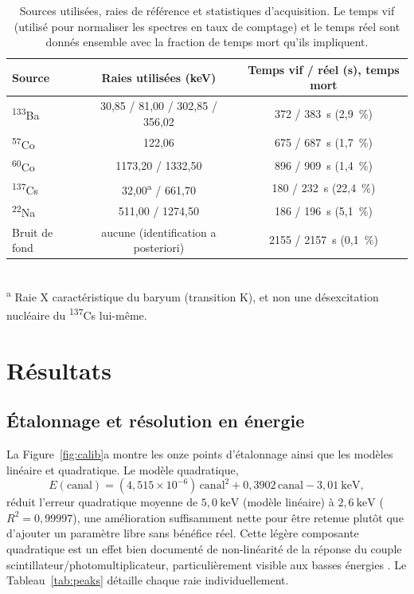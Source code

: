 \documentclass[11pt,letterpaper]{article}
\newcommand{\beq}[1]{\begin{equation} \label{#1}}
\def\enq{\end{equation}}
\begin{document}
\begin{table}[htbp]
\centering
\caption{Sources utilisées, raies de référence et statistiques d'acquisition. Le temps vif (utilisé pour normaliser les spectres en taux de comptage) et le temps réel sont donnés ensemble avec la fraction de temps mort qu'ils impliquent.}
\label{tab:acquisitions}
\small
\begin{tabular}{lcc}
\hline
Source & Raies utilisées (keV) & Temps vif / réel (s), temps mort \\
\hline
\textsuperscript{133}Ba & 30,85 / 81,00 / 302,85 / 356,02 & 372 / 383~s (2,9~\%) \\
\textsuperscript{57}Co  & 122,06 & 675 / 687~s (1,7~\%) \\
\textsuperscript{60}Co  & 1173,20 / 1332,50 & 896 / 909~s (1,4~\%) \\
\textsuperscript{137}Cs & 32,00\textsuperscript{a} / 661,70 & 180 / 232~s (22,4~\%) \\
\textsuperscript{22}Na  & 511,00 / 1274,50 & 186 / 196~s (5,1~\%) \\
Bruit de fond & aucune (identification a posteriori) & 2155 / 2157~s (0,1~\%) \\
\hline
\end{tabular}
\\[0.3em]
{\footnotesize \textsuperscript{a} Raie X caractéristique du baryum (transition K), et non une désexcitation nucléaire du \textsuperscript{137}Cs lui-même.}
\end{table}

\section{Résultats}

\subsection{Étalonnage et résolution en énergie}

La Figure~\ref{fig:calib}a montre les onze points d'étalonnage ainsi que les modèles linéaire et quadratique. Le modèle quadratique,
\beq{eq:calib}
    E(\text{canal}) = (4{,}515 \times 10^{-6})\,\text{canal}^2 + 0{,}3902\,\text{canal} - 3{,}01~\text{keV} ,
\enq
réduit l'erreur quadratique moyenne de $5{,}0~\text{keV}$ (modèle linéaire) à $2{,}6~\text{keV}$ ($R^2 = 0{,}99997$), une amélioration suffisamment nette pour être retenue plutôt que d'ajouter un paramètre libre sans bénéfice réel. Cette légère composante quadratique est un effet bien documenté de non-linéarité de la réponse du couple scintillateur/photomultiplicateur, particulièrement visible aux basses énergies \cite{knoll,engelkemeir}. Le Tableau~\ref{tab:peaks} détaille chaque raie individuellement.
\end{document}
